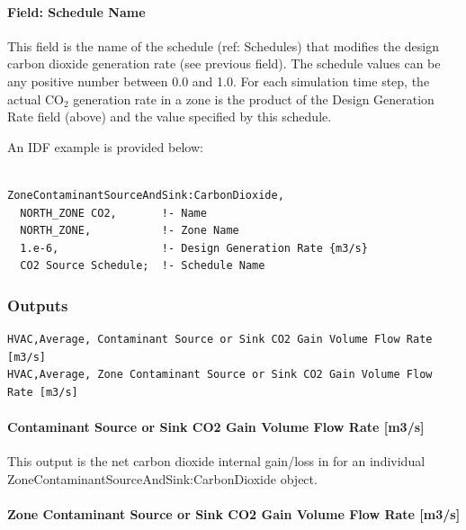 \paragraph{Field: Schedule Name}\label{field-schedule-name-6-000}

This field is the name of the schedule (ref: Schedules) that modifies the design carbon dioxide generation rate (see previous field). The schedule values can be any positive number between 0.0 and 1.0. For each simulation time step, the actual CO\(_{2}\) generation rate in a zone is the product of the Design Generation Rate field (above) and the value specified by this schedule.

An IDF example is provided below:

\begin{lstlisting}

ZoneContaminantSourceAndSink:CarbonDioxide,
  NORTH_ZONE CO2,       !- Name
  NORTH_ZONE,           !- Zone Name
  1.e-6,                !- Design Generation Rate {m3/s}
  CO2 Source Schedule;  !- Schedule Name
\end{lstlisting}

\subsubsection{Outputs}\label{outputs-6-004}

\begin{lstlisting}
HVAC,Average, Contaminant Source or Sink CO2 Gain Volume Flow Rate [m3/s]
HVAC,Average, Zone Contaminant Source or Sink CO2 Gain Volume Flow Rate [m3/s]
\end{lstlisting}

\paragraph{Contaminant Source or Sink CO2 Gain Volume Flow Rate {[}m3/s{]}}\label{contaminant-source-or-sink-co2-gain-volume-flow-rate-m3s}

This output is the net carbon dioxide internal gain/loss in \si{\volumeFlowRate} for an individual ZoneContaminantSourceAndSink:CarbonDioxide object.

\paragraph{Zone Contaminant Source or Sink CO2 Gain Volume Flow Rate {[}m3/s{]}}\label{zone-contaminant-source-or-sink-co2-gain-volume-flow-rate-m3s}

